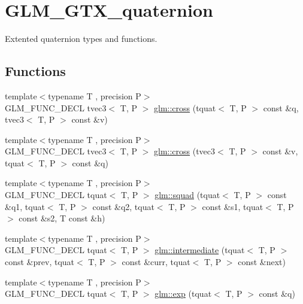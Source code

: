\hypertarget{group__gtx__quaternion}{}\section{G\+L\+M\+\_\+\+G\+T\+X\+\_\+quaternion}
\label{group__gtx__quaternion}


Extented quaternion types and functions.  


\subsection*{Functions}
\begin{DoxyCompactItemize}
\item 
{\footnotesize template$<$typename T , precision P$>$ }\\G\+L\+M\+\_\+\+F\+U\+N\+C\+\_\+\+D\+E\+C\+L tvec3$<$ T, P $>$ \hyperlink{group__gtx__quaternion_ga33ecf8ba903eee5fc09f0fbfc0d5ca6b}{glm\+::cross} (tquat$<$ T, P $>$ const \&q, tvec3$<$ T, P $>$ const \&v)
\item 
{\footnotesize template$<$typename T , precision P$>$ }\\G\+L\+M\+\_\+\+F\+U\+N\+C\+\_\+\+D\+E\+C\+L tvec3$<$ T, P $>$ \hyperlink{group__gtx__quaternion_ga4bfe3c7770fc43d14b8ef0058c4a86b5}{glm\+::cross} (tvec3$<$ T, P $>$ const \&v, tquat$<$ T, P $>$ const \&q)
\item 
{\footnotesize template$<$typename T , precision P$>$ }\\G\+L\+M\+\_\+\+F\+U\+N\+C\+\_\+\+D\+E\+C\+L tquat$<$ T, P $>$ \hyperlink{group__gtx__quaternion_gae75f537becdf2b1381b4482ec96e6c82}{glm\+::squad} (tquat$<$ T, P $>$ const \&q1, tquat$<$ T, P $>$ const \&q2, tquat$<$ T, P $>$ const \&s1, tquat$<$ T, P $>$ const \&s2, T const \&h)
\item 
{\footnotesize template$<$typename T , precision P$>$ }\\G\+L\+M\+\_\+\+F\+U\+N\+C\+\_\+\+D\+E\+C\+L tquat$<$ T, P $>$ \hyperlink{group__gtx__quaternion_ga56abae85b3669c866e91f3c57b298b9c}{glm\+::intermediate} (tquat$<$ T, P $>$ const \&prev, tquat$<$ T, P $>$ const \&curr, tquat$<$ T, P $>$ const \&next)
\item 
{\footnotesize template$<$typename T , precision P$>$ }\\G\+L\+M\+\_\+\+F\+U\+N\+C\+\_\+\+D\+E\+C\+L tquat$<$ T, P $>$ \hyperlink{group__gtx__quaternion_ga17295173d4c2b5ae49b84e9993b63a62}{glm\+::exp} (tquat$<$ T, P $>$ const \&q)
\item 

\end{DoxyCompactItemize}

